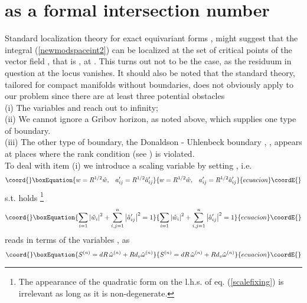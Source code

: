 \documentclass[a4paper,12pt]{article}
\begin{document}
\section{\coordHE{} as a formal intersection number}\label{sec:IV}

Standard localization theory for exact equivariant forms 
\cite{berline}, \cite{schwarz} might suggest that the integral 
(\ref{newmodspaceint2}) can be localized at the set of critical 
points of the vector field \coordHE{}, that is , at \coordHE{}. 
This turns out not to be the case, as the residuum in question at 
the locus \coordHE{} vanishes. It should also be noted that the standard 
theory, tailored for compact manifolds without boundaries, does 
not obviously apply to our problem since there are at least three 
potential obstacles \\
(i) The variables \coordHE{} and \coordHE{} reach out to infinity; \\
(ii) We cannot ignore a Gribov horizon, as noted above, which 
supplies one type of boundary. \\
(iii) The other type of boundary, the Donaldson - Uhlenbeck boundary 
\cite{donaldson}, \cite{uhlenbeck}, appears at places where the 
rank condition (see \cite{adhm}) is violated. \\
To deal with item (i) we introduce a scaling variable by setting 
\coordHE{}, i.e.  
\begin{equation}\coord{}\boxEquation{
w=R^{1/2}\hat{w}, \, \, \, \, \, a'_{ij}=R^{1/2}\hat{a}'_{ij}
}{
w=R^{1/2}\hat{w}, \, \, \, \, \, a'_{ij}=R^{1/2}\hat{a}'_{ij}
}{ecuacion}\coordE{}\end{equation}
s.t. holds \footnote{The appearance of the quadratic form on 
the l.h.s. of eq. (\ref{scalefixing}) is irrelevant as long as 
it is non-degenerate.}
\begin{equation}\coord{}\boxEquation{
\sum_{i=1} \left| \hat{w}_i \right|^2 +\sum_{i,j=1}^n 
\left| \hat{a}'_{ij} \right|^2 = 1
\label{scalefixing} 
}{
\sum_{i=1} \left| \hat{w}_i \right|^2 +\sum_{i,j=1}^n 
\left| \hat{a}'_{ij} \right|^2 = 1
}{ecuacion}\coordE{}\end{equation}       
\coordHE{} reads in terms of the variables \coordHE{}, \coordHE{} as 
\begin{equation}\coord{}\boxEquation{
S^{(n)}=dR \, \hat{\omega}^{(n)}+Rd_v \hat{\omega}^{(n)}
}{
S^{(n)}=dR \, \hat{\omega}^{(n)}+Rd_v \hat{\omega}^{(n)}
}{ecuacion}\coordE{}\end{equation}
\end{document}

